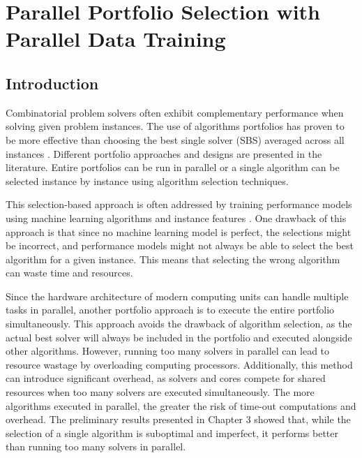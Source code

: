 
\chapter{Parallel Portfolio Selection with Parallel Data Training}


\section{Introduction}

Combinatorial problem solvers often exhibit complementary performance when solving given problem instances. The use of algorithms portfolios has proven to be more effective than choosing the best single solver (SBS) averaged across all instances \cite{Huberman1997,GOMES200143}. Different portfolio approaches and designs are presented in the literature. Entire portfolios can be run in parallel or a single algorithm can be selected instance by instance using algorithm selection techniques. 

This selection-based approach is often addressed by training performance models using machine learning algorithms and instance features \cite{Kotthoff2014,10.1162/evco_a_00242}. One drawback of this approach is that since no machine learning model is perfect, the selections might be incorrect, and performance models might not always be able to select the best algorithm for a given instance. This means that selecting the wrong algorithm can waste time and resources. 

Since the hardware architecture of modern computing units can handle multiple tasks in parallel, another portfolio approach is to execute the entire portfolio simultaneously. This approach avoids the drawback of algorithm selection, as the actual best solver will always be included in the portfolio and executed alongside other algorithms. However, running too many solvers in parallel can lead to resource wastage by overloading computing processors. Additionally, this method can introduce significant overhead, as solvers and cores compete for shared resources when too many solvers are executed simultaneously. The more algorithms executed in parallel, the greater the risk of time-out computations and overhead. The preliminary results presented in Chapter 3 \cite{pmlr-v140-kashgarani21a} showed that, while the selection of a single algorithm is suboptimal and imperfect, it performs better than running too many solvers in parallel.

